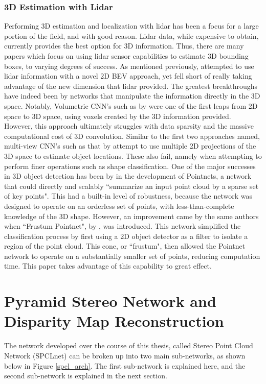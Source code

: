 \subsubsection{3D Estimation with Lidar}
Performing 3D estimation and localization with lidar has been a focus for a large portion of the field, and with good reason. Lidar data, while expensive to obtain, currently provides the best option for 3D information. Thus, there are many papers which focus on using lidar sensor capabilities to estimate 3D bounding boxes, to varying degrees of success. As mentioned previously, \cite{zeng2018rt3d} attempted to use lidar information with a novel 2D BEV approach, yet fell short of really taking advantage of the new dimension that lidar provided. The greatest breakthroughs have indeed been by networks that manipulate the information directly in the 3D space. Notably, Volumetric CNN's such as by \cite{wu20153d} were one of the first leaps from 2D space to 3D space, using voxels created by the 3D information provided. However, this approach ultimately struggles with data sparsity and the massive computational cost of 3D convolution. Similar to the first two approaches named, multi-view CNN's such as that by \cite{su2015multi} attempt to use multiple 2D projections of the 3D space to estimate object locations. These also fail, namely when attempting to perform finer operations such as shape classification. One of the major successes in 3D object detection has been by \cite{qi_pointnet:_2017} in the development of Pointnets, a network that could directly and scalably ``summarize an input point cloud by a sparse set of key points". This had a built-in level of robustness, because the network was designed to operate on an orderless set of points, with less-than-complete knowledge of the 3D shape. However, an improvement came by the same authors when ``Frustum Pointnet", by \cite{qi_frustum_2017}, was introduced. This network simplified the classification process by first using a 2D object detector as a filter to isolate a region of the point cloud. This cone, or ``frustum", then allowed the Pointnet network to operate on a substantially smaller set of points, reducing computation time. This paper takes advantage of this capability to great effect.

\newpage
\section{Pyramid Stereo Network and Disparity Map Reconstruction} %
\label{sect_psmnet}
The network developed over the course of this thesis, called Stereo Point Cloud Network (SPCLnet) can be broken up into two main sub-networks, as shown below in Figure \ref{spcl_arch}. The first sub-network is explained here, and the second sub-network is explained in the next section.

